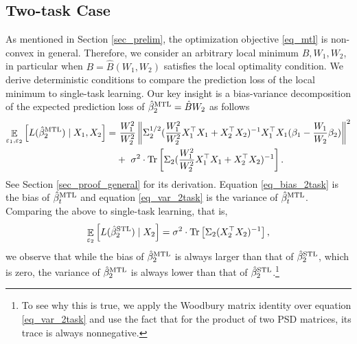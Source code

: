 \subsection{Two-task Case}\label{sec_two}

As mentioned in Section \ref{sec_prelim}, the optimization objective \eqref{eq_mtl} is non-convex in general.
Therefore, we consider an arbitrary local minimum $B, W_1, W_2$, in particular when $B = \hat{B}(W_1, W_2)$ satisfies the local optimality condition.
We derive deterministic conditions to compare the prediction loss of the local minimum to single-task learning.
Our key insight is a bias-variance decomposition of the expected prediction loss of $\hat{\beta}_2^{\textup{MTL}} = \hat{B} W_2$ as follows
\begin{align}
	\mathop{\mathbb{E}}_{\varepsilon_1, \varepsilon_2}\left[ L(\hat{\beta}_2^{\textup{MTL}}) \mid X_1, X_2 \right]
	=&~ \frac{W_1^2}{W_2^2} \left\| \Sigma_2^{1/2}(\frac{W_1^2}{W_2^2} X_1^{\top}X_1 + X_2^{\top}X_2)^{-1} X_1^{\top}X_1 (\beta_1 - \frac{W_1}{W_2} \beta_2) \right\|^2 \label{eq_bias_2task} \\
			&+~  \sigma^2\cdot \operatorname{Tr}\left[\Sigma_2(\frac{W_1^2}{W_2^2} X_1^{\top}X_1 + X_2^{\top}X_2)^{-1} \right]. \label{eq_var_2task}
\end{align}
See Section \ref{sec_proof_general} for its derivation.
Equation \eqref{eq_bias_2task} is the bias of $\hat{\beta}_t^{\textup{MTL}}$ and
equation \eqref{eq_var_2task} is the variance of $\hat{\beta}_t^{\textup{MTL}}$.
Comparing the above to single-task learning, that is,
\begin{align}
	\mathop{\mathbb{E}}_{\varepsilon_2}\left[ L(\hat{\beta}_2^{\textup{STL}}) \mid X_2 \right] = \sigma^2 \cdot \operatorname{Tr}\left[\Sigma_2 (X_2^{\top} X_2)^{-1}\right], \label{eq_var_stl}
\end{align}
we observe that while the bias of $\hat{\beta}_2^{\textup{MTL}}$ is always larger than that of $\hat{\beta}_2^{\textup{STL}}$, which is zero, the variance of $\hat{\beta}_2^{\textup{MTL}}$ is always lower than that of $\hat{\beta}_2^{\textup{STL}}$.\footnote{To see why this is true, we apply the Woodbury matrix identity over equation \eqref{eq_var_2task} and use the fact that for the product of two PSD matrices, its trace is always nonnegative.}
